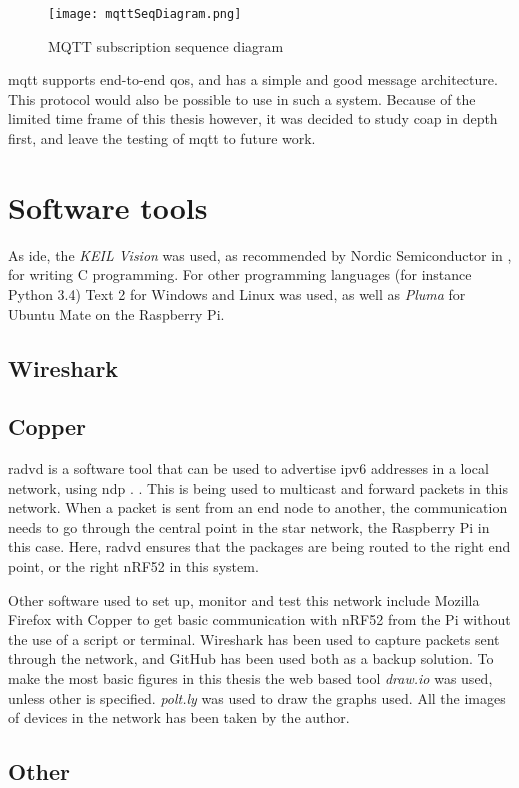 \begin{figure}[ht]
    \centering
    \texttt{[image: mqttSeqDiagram.png]}    
    \caption{MQTT subscription sequence diagram}
    \label{fig:mqttSeqDiagram}
\end{figure}

\gls{mqtt} supports end-to-end \gls{qos}, and has a simple and good message architecture. This protocol would also be possible to use in such a system. Because of the limited time frame of this thesis however, it was decided to study \gls{coap} in depth first, and leave the testing of \gls{mqtt} to future work. 



\section{Software tools}

As \gls{ide}, the \textit{KEIL Vision} was used, as recommended by Nordic Semiconductor in \cite{nordicSoftwareTools}, for writing C programming. For other programming languages (for instance Python 3.4)  Text 2 for Windows and Linux was used, as well as \textit{Pluma} for Ubuntu Mate on the Raspberry Pi. 

\subsection{Wireshark}

\subsection{Copper}

\gls{radvd} is a software tool that can be used to advertise \gls{ipv6} addresses in a local network, using \gls{ndp} \cite{chown2011rogue}. . This is being used to multicast and forward packets in this network. When a packet is sent from an end node to another, the communication needs to go through the central point in the star network, the Raspberry Pi in this case. Here, \gls{radvd} ensures that the packages are being routed to the right end point, or the right nRF52 in this system. 

Other software used to set up, monitor and test this network include Mozilla Firefox with Copper  to get basic communication with nRF52 from the Pi without the use of a script or terminal. Wireshark has been used to capture packets sent through the network, and GitHub has been used both as a backup solution. To make the most basic figures in this thesis the web based tool \textit{draw.io} was used, unless other is specified. \textit{polt.ly} was used to draw the graphs used. All the images of devices in the network has been taken by the author. 

\subsection{Other}
